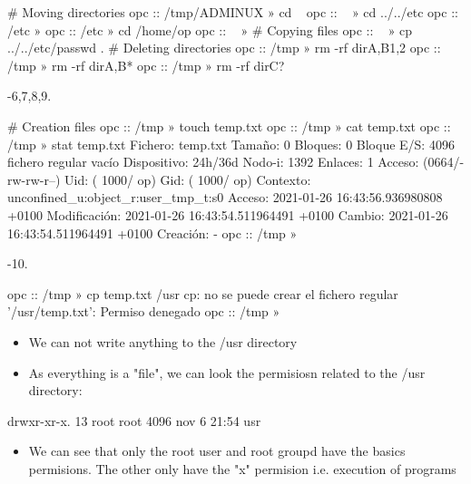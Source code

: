 \documentclass[a4paper]{article}
\begin{document}
\begin{plain}
# Moving directories
opc :: /tmp/ADMINUX » cd ~          
opc :: ~ » cd ../../etc 
opc :: /etc » 
opc :: /etc » cd /home/op          
opc :: ~ » 
# Copying files
opc :: ~ » cp ../../etc/passwd .
# Deleting directories
opc :: /tmp » rm -rf dir{A,B}{1,2}
opc :: /tmp » rm -rf dir{A,B}*
opc :: /tmp » rm -rf dirC?
\end{plain}

{-\allowbreak}6,7,8,9.

\begin{plain}
# Creation files
opc :: /tmp » touch temp.txt  
opc :: /tmp » cat temp.txt      
opc :: /tmp » stat temp.txt                                                                                               Fichero: temp.txt
  Tamaño: 0             Bloques: 0          Bloque E/S: 4096   fichero regular vacío
Dispositivo: 24h/36d    Nodo-i: 1392        Enlaces: 1
Acceso: (0664/-rw-rw-r--)  Uid: ( 1000/      op)   Gid: ( 1000/      op)
Contexto: unconfined_u:object_r:user_tmp_t:s0
      Acceso: 2021-01-26 16:43:56.936980808 +0100
Modificación: 2021-01-26 16:43:54.511964491 +0100
      Cambio: 2021-01-26 16:43:54.511964491 +0100
    Creación: -
opc :: /tmp » 
\end{plain}

{-\allowbreak}10. 

\begin{plain}
opc :: /tmp » cp temp.txt /usr    
cp: no se puede crear el fichero regular '/usr/temp.txt': Permiso denegado
opc :: /tmp » 
\end{plain}

\begin{itemize}
\item 
We can not write anything to the {/\allowbreak}usr directory
\item 
As everything is a "file", we can look the permisiosn related to the {/\allowbreak}usr directory:
\end{itemize}

\begin{plain}
drwxr-xr-x.  13 root root  4096 nov  6 21:54 usr
\end{plain}

\begin{itemize}
\item 
We can see that only the root user and root groupd have the basics permisions. The other only have the "x" permision i.e. execution of programs
\end{itemize}
\end{document}
